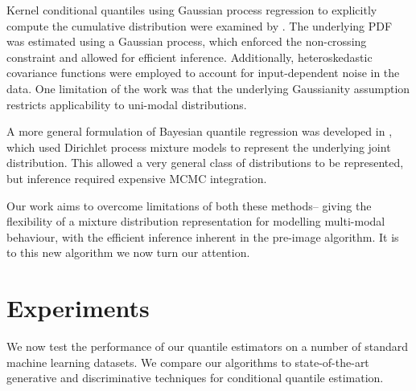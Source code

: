 \documentclass[twoside]{article} \usepackage{aistats2017}
\theoremstyle{definition}
\begin{document}
	Kernel conditional quantiles using Gaussian process regression to explicitly compute the cumulative distribution were examined by \cite{Quadrianto2009}. The underlying PDF was estimated using a Gaussian process, which enforced the non-crossing constraint and allowed for efficient inference. Additionally, heteroskedastic covariance functions were employed to account for input-dependent noise in the data. One limitation of the work was that the underlying Gaussianity assumption restricts applicability to uni-modal distributions.
	
	A more general formulation of Bayesian quantile regression was developed in \cite{Taddy2010}, which used Dirichlet process mixture models to represent the underlying joint distribution. This allowed a very general class of distributions to be represented, but inference required expensive MCMC integration.
	
	
	
	Our work aims to overcome limitations of both these methods-- giving the flexibility of a mixture distribution representation for modelling multi-modal behaviour, with the efficient inference inherent in the pre-image algorithm. It is to this new algorithm we now turn our attention.

\section{Experiments}
\label{sec:experiments}

	We now test the performance of our quantile estimators on a number of standard machine learning datasets. We compare our algorithms to state-of-the-art generative and discriminative techniques for conditional quantile estimation.
	
\end{document}
